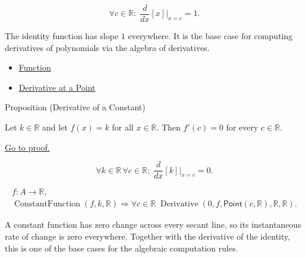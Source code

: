 \begin{remark*}
\[
\forall c \in \mathbb{R}:\; \frac{d}{dx}[x]\big|_{x=c} = 1.
\]
\end{remark*}

\begin{remark*}[Interpretation]
The identity function has slope $1$ everywhere. It is the base case for computing derivatives of polynomials via the algebra of derivatives.
\end{remark*}

\begin{dependencies}
\begin{itemize}
  \item \hyperref[def:function]{Function}
  \item \hyperref[def:derivative-at-a-point]{Derivative at a Point}
\end{itemize}
\end{dependencies}


\begin{propositionbox}{Proposition (Derivative of a Constant)}
\begin{proposition}
\label{prop:derivative-of-a-constant}
Let $k\in\mathbb{R}$ and let $f(x)=k$ for all $x\in\mathbb{R}$. Then $f'(c)=0$ for every $c\in\mathbb{R}$.

\smallskip\noindent
\hyperref[prf:derivative-of-a-constant]{Go to proof.}
\end{proposition}
\end{propositionbox}

\begin{remark*}
\[
  \forall k\in\mathbb{R}\,\forall c\in\mathbb{R}:\;
  \frac{d}{dx}[k]\big|_{x=c}=0.
\]
\end{remark*}

\begin{remark*}
\[
\begin{aligned}
  f\colon A\to\mathbb{R},\\
\operatorname{ConstantFunction}(f,k,\mathbb{R})
\Longrightarrow
\forall c\in\mathbb{R}\;
\operatorname{Derivative}(0,f,\mathsf{Point}(c,\mathbb R),\mathbb R,\mathbb R).
\end{aligned}
\]
\end{remark*}

\begin{remark*}[Interpretation]
A constant function has zero change across every secant line, so its instantaneous rate of change is zero everywhere. Together with the derivative of the identity, this is one of the base cases for the algebraic computation rules.
\end{remark*}

